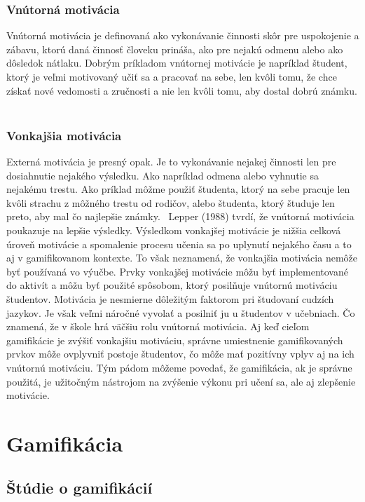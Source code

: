 \documentclass[10pt,oneside,slovak,a4paper]{article}
\begin{document}
\subsubsection{Vnútorná motivácia} \label{vnutorna}
Vnútorná motivácia je definovaná ako vykonávanie činnosti skôr pre uspokojenie a zábavu, ktorú daná činnosť človeku prináša, ako pre nejakú odmenu alebo ako dôsledok nátlaku. Dobrým príkladom vnútornej motivácie je napríklad študent, ktorý je veľmi motivovaný učiť sa a pracovať na sebe, len kvôli tomu, že chce získať nové vedomosti a zručnosti a nie len kvôli tomu, aby dostal dobrú známku. ~\cite{ryan2000intrinsic}

\subsubsection{Vonkajšia motivácia} \label{vonkajsia}
Externá motivácia je presný opak. Je to vykonávanie nejakej činnosti len pre dosiahnutie nejakého výsledku. Ako napríklad odmena alebo vyhnutie sa nejakému trestu. Ako príklad môžme použiť študenta, ktorý na sebe pracuje len kvôli strachu z môžného trestu od rodičov, alebo študenta, ktorý študuje len preto, aby mal čo najlepšie známky.~\cite{ryan2000intrinsic}
Lepper (1988) tvrdí, že vnútorná motivácia poukazuje na lepšie výsledky. Výsledkom vonkajšej motivácie je nižšia celková úroveň motivácie a spomalenie procesu učenia sa po uplynutí nejakého času a to aj v gamifikovanom kontexte. To však neznamená, že vonkajšia motivácia nemôže byť používaná vo výučbe. Prvky vonkajšej motivácie môžu byť implementované do aktivít a môžu byť použité spôsobom, ktorý posilňuje vnútornú motiváciu študentov.
Motivácia je nesmierne dôležitým faktorom pri študovaní cudzích jazykov. Je však veľmi náročné vyvolať a posilniť ju u študentov v učebniach. Čo znamená, že v škole hrá väčšiu rolu vnútorná motivácia. Aj keď cieľom gamifikácie je zvýšiť vonkajšiu motiváciu, správne umiestnenie gamifikovaných prvkov môže ovplyvniť postoje študentov, čo môže mať pozitívny vplyv aj na ich vnútornú motiváciu. Tým pádom môžeme povedať, že gamifikácia, ak je správne použitá, je užitočným nástrojom na zvýšenie výkonu pri učení sa, ale aj zlepšenie motivácie. 
~\cite{garland2015gamification}

\section{Gamifikácia}\label{gamificationsection}
\subsection{Štúdie o gamifikácií} \label{studies}
\end{document}
